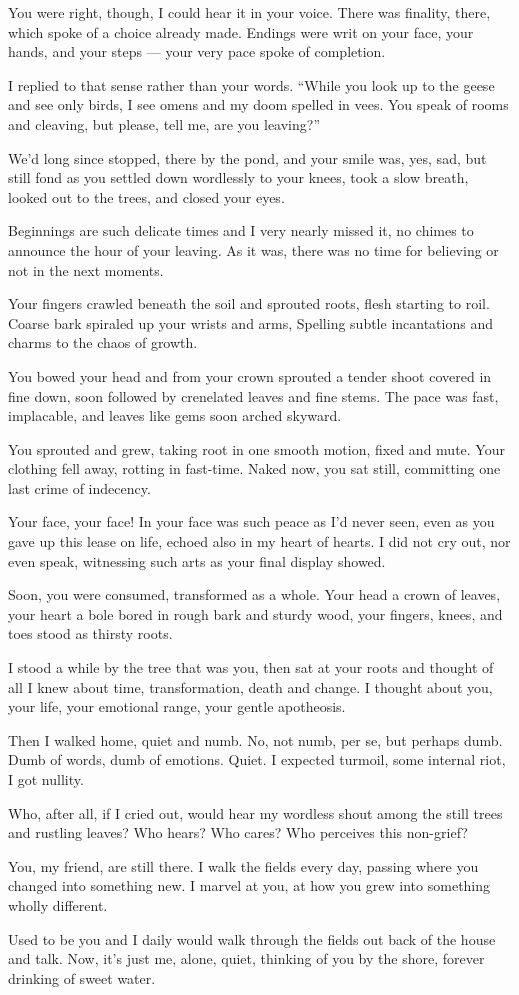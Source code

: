 You were right, though, I could hear it in your voice. There was finality, there, which spoke of a choice already made. Endings were writ on your face, your hands, and your steps --- your very pace spoke of completion.

I replied to that sense rather than your words. ``While you look up to the geese and see only birds, I see omens and my doom spelled in vees. You speak of rooms and cleaving, but please, tell me, are you leaving?''

We'd long since stopped, there by the pond, and your smile was, yes, sad, but still fond as you settled down wordlessly to your knees, took a slow breath, looked out to the trees, and closed your eyes.

Beginnings are such delicate times and I very nearly missed it, no chimes to announce the hour of your leaving. As it was, there was no time for believing or not in the next moments.

Your fingers crawled beneath the soil and sprouted roots, flesh starting to roil. Coarse bark spiraled up your wrists and arms, Spelling subtle incantations and charms to the chaos of growth.

You bowed your head and from your crown sprouted a tender shoot covered in fine down, soon followed by crenelated leaves and fine stems. The pace was fast, implacable, and leaves like gems soon arched skyward.

You sprouted and grew, taking root in one smooth motion, fixed and mute. Your clothing fell away, rotting in fast-time. Naked now, you sat still, committing one last crime of indecency.

Your face, your face! In your face was such peace as I'd never seen, even as you gave up this lease on life, echoed also in my heart of hearts. I did not cry out, nor even speak, witnessing such arts as your final display showed.

Soon, you were consumed, transformed as a whole. Your head a crown of leaves, your heart a bole bored in rough bark and sturdy wood, your fingers, knees, and toes stood as thirsty roots.

I stood a while by the tree that was you, then sat at your roots and thought of all I knew about time, transformation, death and change. I thought about you, your life, your emotional range, your gentle apotheosis.

Then I walked home, quiet and numb. No, not numb, per se, but perhaps dumb. Dumb of words, dumb of emotions. Quiet. I expected turmoil, some internal riot, I got nullity.

Who, after all, if I cried out, would hear my wordless shout among the still trees and rustling leaves? Who hears? Who cares? Who perceives this non-grief?

You, my friend, are still there. I walk the fields every day, passing where you changed into something new. I marvel at you, at how you grew into something wholly different.

Used to be you and I daily would walk through the fields out back of the house and talk. Now, it's just me, alone, quiet, thinking of you by the shore, forever drinking of sweet water.

